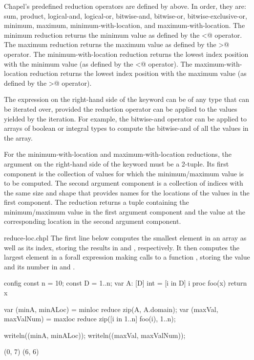 Chapel's predefined reduction operators are defined
by  above.  In order, they are: sum,
product, logical-and, logical-or, bitwise-and, bitwise-or,
bitwise-exclusive-or, minimum, maximum, minimum-with-location, and
maximum-with-location.  The minimum reduction returns the minimum
value as defined by the \verb@<@ operator.  The maximum reduction
returns the maximum value as defined by the \verb@>@ operator.  The
minimum-with-location reduction returns the lowest index position with
the minimum value (as defined by the \verb@<@ operator).  The
maximum-with-location reduction returns the lowest index position with
the maximum value (as defined by the \verb@>@ operator).

The expression on the right-hand side of the  keyword
can be of any type that can be iterated over, provided
the reduction operator can be applied to the values yielded
by the iteration. For example, the bitwise-and
operator can be applied to arrays of boolean or integral types to
compute the bitwise-and of all the values in the array.

For the minimum-with-location and maximum-with-location reductions,
the argument on the right-hand side of the  keyword
must be a 2-tuple. Its first component is the collection
of values for which the minimum/maximum value is to be computed.  The
second argument component is a collection of indices with the same size and
shape that provides names for the locations of the values in the first
component.  The reduction returns a tuple containing the
minimum/maximum value in the first argument component and the value
at the corresponding location in the second argument component.

\begin{chapelexample}{reduce-loc.chpl}
The first line below computes the smallest element in an array
 as well as its index, storing the results in  and
, respectively.  It then computes the largest element in
a forall expression making calls to a function , storing
the value and its number in  and .
\begin{chapelnoprint}
config const n = 10;
const D = {1..n};
var A: [D] int = [i in D] i %
proc foo(x) return x %
\end{chapelnoprint}
\begin{chapel}
var (minA, minALoc) = minloc reduce zip(A, A.domain); 
var (maxVal, maxValNum) = maxloc reduce zip([i in 1..n] foo(i), 1..n);
\end{chapel}
\begin{chapelnoprint}
writeln((minA, minALoc));
writeln((maxVal, maxValNum));
\end{chapelnoprint}
\begin{chapeloutput}
(0, 7)
(6, 6)
\end{chapeloutput}
\end{chapelexample}

